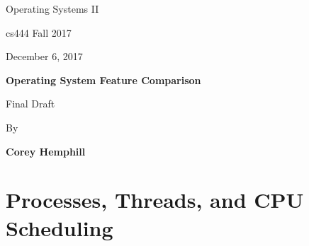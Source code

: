 \documentclass[onecolumn, draftclsnofoot,10pt, compsoc]{IEEEtran}
\def \Author{Corey Hemphill}
\def \Title{Operating System Feature Comparison}
\def \Subtitle{Final Draft}
\def \Term{cs444 Fall 2017}
\def \DueDate{December 6, 2017}
\def \DocType{
	Operating Systems II
}
\begin{document}
\begin{titlepage}
    \begin{singlespace}
        \hfill  
        \par\vspace{.2in}
        \centering
        \scshape{
            \huge  \DocType \par
           	\huge \Term \par
            {\large \DueDate}\par
            \vspace{.5in}
            \textbf{\Huge \Title}\par
            {\large \Subtitle}\par
            \vspace{.5in}
           
            {\large By }\par
           	\textbf{\Author}\par
   
            \vspace{5pt}
            }
            \vspace{120pt}
        
        \begin{abstract}
        This document examines, compares, and contrasts attributes of a number of low-level operating system kernel features such as processes, threads, CPU scheduling, block and character IO, memory management, and file systems. The following sections of this document discuss several similarities and differences between features of Windows and FreeBSD operating system kernels, and also compare these features with those of the Linux operating system kernel. The purpose of this document is to discuss why certain modern-day operating system features are implemented the way they are. For some of these features, similar approaches are used by many operating systems, and for others, implementations can vary widely for a number of different reasons.
        \end{abstract} 
        
    \end{singlespace}
\end{titlepage}
\newpage
{}
\tableofcontents

\newpage
\section{Processes, Threads, and CPU Scheduling}
\end{document}
